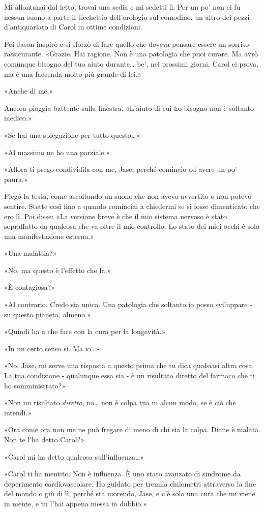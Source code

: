 Mi allontanai dal letto, trovai una sedia e mi sedetti lì. Per un po'
non ci fu nessun suono a parte il ticchettio dell'orologio sul comodino,
un altro dei pezzi d'antiquariato di Carol in ottime condizioni.

Poi Jason inspirò e si sforzò di fare quello che doveva pensare essere
un sorriso rassicurante. «Grazie. Hai ragione. Non è una patologia che
puoi curare. Ma avrò comunque bisogno del tuo aiuto durante\ldots{} be',
nei prossimi giorni. Carol ci prova, ma è una faccenda molto più grande
di lei.»

«Anche di me.»

Ancora pioggia battente sulla finestra. «L'aiuto di cui ho bisogno non è
soltanto medico.»

«Se hai una spiegazione per tutto questo\ldots»

«Al massimo ne ho una parziale.»

«Allora ti prego condividila con me, Jase, perché comincio ad avere un
po' paura.»

Piegò la testa, come ascoltando un suono che non avevo avvertito o non
potevo sentire. Stette così fino a quando cominciai a chiedermi se si
fosse dimenticato che ero lì. Poi disse: «La versione breve è che il mio
sistema nervoso è stato sopraffatto da qualcosa che va oltre il mio
controllo. Lo stato dei miei occhi è solo una manifestazione esterna.»

«Una malattia?»

«No, ma questo è l'effetto che fa.»

«È contagiosa?»

«Al contrario. Credo sia unica. Una patologia che soltanto io posso
sviluppare - su questo pianeta, almeno.»

«Quindi ha a che fare con la cura per la longevità.»

«In un certo senso sì. Ma io\ldots»

«No, Jase, mi serve una risposta a questo prima che tu dica qualsiasi
altra cosa. La tua condizione - qualunque essa sia - è un risultato
diretto del farmaco che ti ho somministrato?»

«Non un risultato \emph{diretto}, no\ldots{} non è colpa tua in alcun
modo, se è ciò che intendi.»

«Ora come ora non me ne può fregare di meno di chi sia la colpa. Diane è
malata. Non te l'ha detto Carol?»

«Carol mi ha detto qualcosa sull'influenza\ldots»

«Carol ti ha mentito. Non è influenza. È uno stato avanzato di sindrome
da deperimento cardiovascolare. Ho guidato per tremila chilometri
attraverso la fine del mondo o giù di lì, perché sta morendo, Jase, e
c'è solo una cura che mi viene in mente, e tu l'hai appena messa in
dubbio.»

